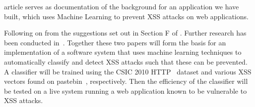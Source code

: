 \documentclass[10pt,journal,compsoc]{IEEEtran}
\begin{document}




% 
% 
% 
% 
 article serves as documentation of the background for an application we have built, which uses
Machine Learning to prevent XSS attacks on web applications.

Following on from the suggestions set out in Section F of \citep*{nunan}.
Further research has been conducted in~\citep*{khan}.
Together these two papers will form the basis for an implementation of a software system that uses
machine learning techniques to automatically classify and detect XSS attacks such that these can be prevented.
A classifier will be trained using the CSIC 2010 HTTP~\citep*{csic2010} dataset and various XSS vectors
found on pastebin~\citep*{pastebin}, respectively.
Then the efficiency of the classifier will be tested on a live system running a
web application known to be vulnerable to XSS attacks.
\end{document}
